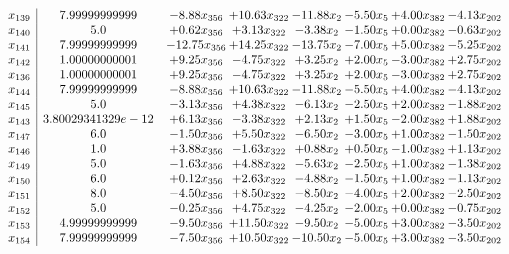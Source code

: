 \documentclass[8pt]{article}
\begin{document}
\[\begin{array}{c| c c@{\hskip 2pt} c@{\hskip 2pt} c@{\hskip 2pt} c@{\hskip 2pt} c@{\hskip 2pt} c@{\hskip 2pt} }
 x_{139}   &  7.99999999999 & -8.88 x_{356} & + 10.63 x_{322} & -11.88 x_{2} & -5.50 x_{5} & +  4.00 x_{382} & -4.13 x_{202}\\
 x_{140}   &  5.0 & +  0.62 x_{356} & +  3.13 x_{322} & -3.38 x_{2} & -1.50 x_{5} & +  0.00 x_{382} & -0.63 x_{202}\\
 x_{141}   &  7.99999999999 & -12.75 x_{356} & + 14.25 x_{322} & -13.75 x_{2} & -7.00 x_{5} & +  5.00 x_{382} & -5.25 x_{202}\\
 x_{142}   &  1.00000000001 & +  9.25 x_{356} & -4.75 x_{322} & +  3.25 x_{2} & +  2.00 x_{5} & -3.00 x_{382} & +  2.75 x_{202}\\
 x_{136}   &  1.00000000001 & +  9.25 x_{356} & -4.75 x_{322} & +  3.25 x_{2} & +  2.00 x_{5} & -3.00 x_{382} & +  2.75 x_{202}\\
 x_{144}   &  7.99999999999 & -8.88 x_{356} & + 10.63 x_{322} & -11.88 x_{2} & -5.50 x_{5} & +  4.00 x_{382} & -4.13 x_{202}\\
 x_{145}   &  5.0 & -3.13 x_{356} & +  4.38 x_{322} & -6.13 x_{2} & -2.50 x_{5} & +  2.00 x_{382} & -1.88 x_{202}\\
 x_{143}   &  3.80029341329e-12 & +  6.13 x_{356} & -3.38 x_{322} & +  2.13 x_{2} & +  1.50 x_{5} & -2.00 x_{382} & +  1.88 x_{202}\\
 x_{147}   &  6.0 & -1.50 x_{356} & +  5.50 x_{322} & -6.50 x_{2} & -3.00 x_{5} & +  1.00 x_{382} & -1.50 x_{202}\\
 x_{146}   &  1.0 & +  3.88 x_{356} & -1.63 x_{322} & +  0.88 x_{2} & +  0.50 x_{5} & -1.00 x_{382} & +  1.13 x_{202}\\
 x_{149}   &  5.0 & -1.63 x_{356} & +  4.88 x_{322} & -5.63 x_{2} & -2.50 x_{5} & +  1.00 x_{382} & -1.38 x_{202}\\
 x_{150}   &  6.0 & +  0.12 x_{356} & +  2.63 x_{322} & -4.88 x_{2} & -1.50 x_{5} & +  1.00 x_{382} & -1.13 x_{202}\\
 x_{151}   &  8.0 & -4.50 x_{356} & +  8.50 x_{322} & -8.50 x_{2} & -4.00 x_{5} & +  2.00 x_{382} & -2.50 x_{202}\\
 x_{152}   &  5.0 & -0.25 x_{356} & +  4.75 x_{322} & -4.25 x_{2} & -2.00 x_{5} & +  0.00 x_{382} & -0.75 x_{202}\\
 x_{153}   &  4.99999999999 & -9.50 x_{356} & + 11.50 x_{322} & -9.50 x_{2} & -5.00 x_{5} & +  3.00 x_{382} & -3.50 x_{202}\\
 x_{154}   &  7.99999999999 & -7.50 x_{356} & + 10.50 x_{322} & -10.50 x_{2} & -5.00 x_{5} & +  3.00 x_{382} & -3.50 x_{202}\\

\end{array}\]
\end{document}
